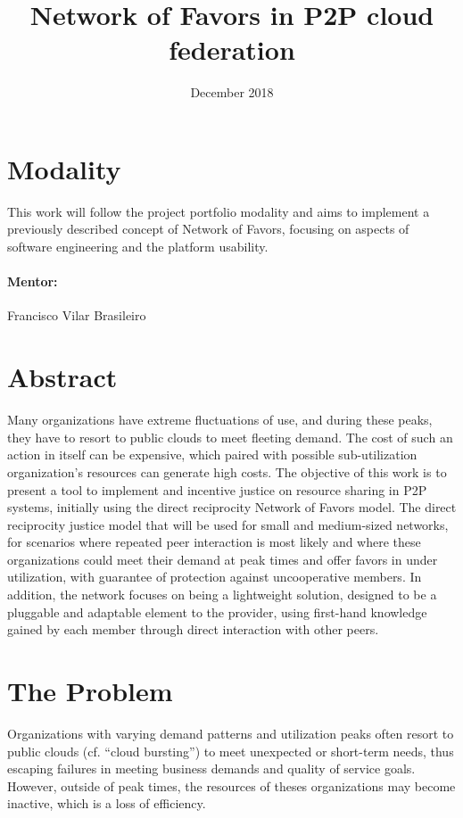 \documentclass{article}
\title{Network of Favors in P2P cloud federation}
\author{Gustavo Diniz Monteiro \\ \href{gustavo.monteiro@ccc.ufcg.edu.br, gustavo.d.monteiro@icloud.com} }
\date{December 2018}
\begin{document}
\maketitle

\section{Modality}

This work will follow the project portfolio modality and aims to implement a previously described concept of Network of Favors\cite{nof}, focusing on aspects of software engineering and the platform usability.

\paragraph{Mentor:} Francisco Vilar Brasileiro

\section{Abstract}
Many organizations have extreme fluctuations of use, and during these peaks, they have to resort to public clouds to meet fleeting demand. The cost of such an action in itself can be expensive, which paired with possible sub-utilization organization's resources can generate high costs. The objective of this work is to present a tool to implement and incentive justice on resource sharing in P2P systems, initially using the direct reciprocity Network of Favors model. The direct reciprocity justice model that will be used for small and medium-sized networks, for scenarios where repeated peer interaction is most likely and where these organizations could meet their demand at peak times and offer favors in under utilization, with guarantee of protection against uncooperative members. In addition, the network focuses on being a lightweight solution, designed to be a pluggable and adaptable element to the provider, using first-hand knowledge gained by each member through direct interaction with other peers.

\section{The Problem}
Organizations with varying demand patterns and utilization peaks often resort to public clouds (cf. “cloud bursting”\cite{cloudburst}) to meet unexpected or short-term needs, thus escaping failures in meeting business demands and quality of service goals.
However, outside of peak times, the resources of theses organizations may become inactive, which is a loss of efficiency.
\end{document}
